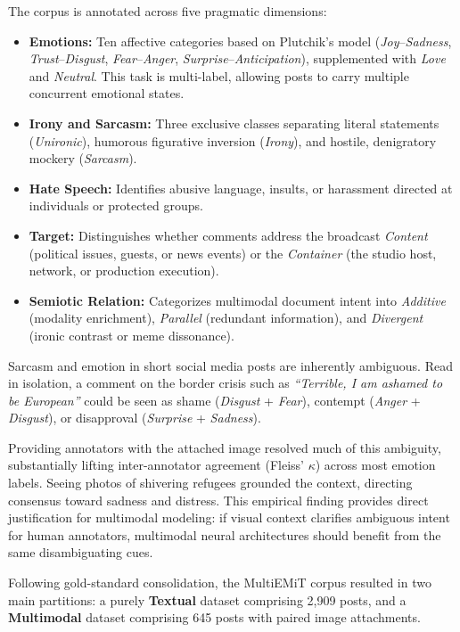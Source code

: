 The corpus is annotated across five pragmatic dimensions:
\begin{itemize}
    \item \textbf{Emotions:} Ten affective categories based on Plutchik's model \cite{Plutchik} (\textit{Joy}--\textit{Sadness}, \textit{Trust}--\textit{Disgust}, \textit{Fear}--\textit{Anger}, \textit{Surprise}--\textit{Anticipation}), supplemented with \textit{Love} and \textit{Neutral}. This task is multi-label, allowing posts to carry multiple concurrent emotional states.
    \item \textbf{Irony and Sarcasm:} Three exclusive classes separating literal statements (\textit{Unironic}), humorous figurative inversion (\textit{Irony}), and hostile, denigratory mockery (\textit{Sarcasm}).
    \item \textbf{Hate Speech:} Identifies abusive language, insults, or harassment directed at individuals or protected groups.
    \item \textbf{Target:} Distinguishes whether comments address the broadcast \textit{Content} (political issues, guests, or news events) or the \textit{Container} (the studio host, network, or production execution).
    \item \textbf{Semiotic Relation:} Categorizes multimodal document intent \cite{MultiM} into \textit{Additive} (modality enrichment), \textit{Parallel} (redundant information), and \textit{Divergent} (ironic contrast or meme dissonance).
\end{itemize}

Sarcasm and emotion in short social media posts are inherently ambiguous. Read in isolation, a comment on the border crisis such as \textit{``Terrible, I am ashamed to be European''} could be seen as shame (\textit{Disgust} + \textit{Fear}), contempt (\textit{Anger} + \textit{Disgust}), or disapproval (\textit{Surprise} + \textit{Sadness}).

Providing annotators with the attached image resolved much of this ambiguity, substantially lifting inter-annotator agreement (Fleiss' $\kappa$) across most emotion labels. Seeing photos of shivering refugees grounded the context, directing consensus toward sadness and distress. This empirical finding provides direct justification for multimodal modeling: if visual context clarifies ambiguous intent for human annotators, multimodal neural architectures should benefit from the same disambiguating cues.

Following gold-standard consolidation, the MultiEMiT corpus resulted in two main partitions: a purely \textbf{Textual} dataset comprising 2,909 posts, and a \textbf{Multimodal} dataset comprising 645 posts with paired image attachments. 

